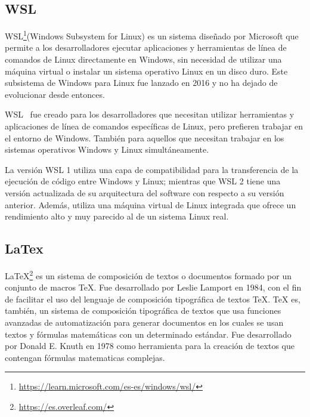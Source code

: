 \documentclass[a4paper, 12pt]{book}
\begin{document}
\subsection{WSL} %
\label{sec:wsl} %

WSL\footnote{\url{https://learn.microsoft.com/es-es/windows/wsl/}}(Windows Subsystem for Linux) es un sistema diseñado por Microsoft que permite a los desarrolladores ejecutar aplicaciones y herramientas de línea de comandos de Linux directamente en Windows, sin necesidad de utilizar una máquina virtual o instalar un sistema operativo Linux en un disco duro. 
Este subsistema de Windows para Linux fue lanzado en 2016 y no ha dejado de evolucionar desde entonces. 


WSL~\cite{medriforensic} fue creado para los desarrolladores que necesitan utilizar herramientas y aplicaciones de línea de comandos específicas de Linux, pero prefieren trabajar en el entorno de Windows. 
También para aquellos que necesitan trabajar en los sistemas operativos Windows y Linux simultáneamente.


La versión WSL 1 utiliza una capa de compatibilidad para la transferencia de la ejecución de código entre Windows y Linux;
mientras que WSL 2 tiene una versión actualizada de su arquitectura del software con respecto a su versión anterior. 
Además, utiliza una máquina virtual de Linux integrada que ofrece un rendimiento alto y muy parecido al de un sistema Linux real.


\subsection{LaTex} %
\label{sec:latex} %

LaTeX\footnote{\url{https://es.overleaf.com/}} es un sistema de composición de textos o documentos formado por un conjunto de macros TeX. 
Fue desarrollado por Leslie Lamport en 1984, con el fin de facilitar el uso del lenguaje de composición tipográfica de textos TeX.
TeX es, también, un sistema de composición tipográfica de textos que usa funciones avanzadas de automatización para generar documentos en los cuales se usan textos y fórmulas matemáticas con un determinado estándar.
Fue desarrollado por Donald E. Knuth en 1978 como herramienta para la creación de textos que contengan fórmulas matematicas complejas.
\end{document}

